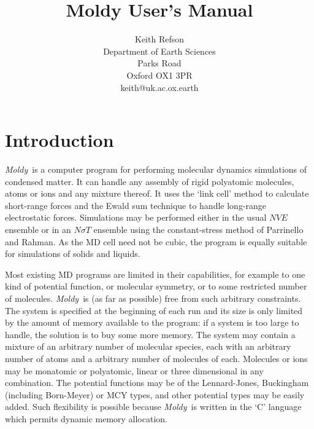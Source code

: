 \oddsidemargin=0in
\textwidth=6.5in
\title{{\Huge Moldy User's Manual}}
\author{Keith Refson\\Department of Earth Sciences\\Parks Road
\\Oxford OX1 3PR\\keith@uk.ac.ox.earth\\}

\newcommand{\moldy}{{\em Moldy}}
\newcommand{\etc}{{\em etc}}
\newcommand{\eg}{{\em e.g}.\ }
\newcommand{\ie}{{\em i.e}.\ }
\newcommand{\bm}[1]{\mbox{\boldmath \protect\(#1\protect\)}}

\newcommand{\erf}{\mbox{erf}}
\newcommand{\erfc}{\mbox{erfc}}

\maketitle
\tableofcontents

\chapter{Introduction}

\moldy\  is a computer program for performing molecular dynamics
simulations of condensed matter.  It can handle any assembly of rigid
polyatomic molecules, atoms or ions and any mixture thereof. It uses
the `link cell' method to calculate short-range forces and the Ewald
sum technique to handle long-range electrostatic forces.  Simulations
may be performed either in the usual $NVE$ ensemble or in an $N\sigma
T$ ensemble using the constant-stress method of Parrinello and Rahman.
As the MD cell need not be cubic, the program is equally suitable for
simulations of solids and liquids.

Most existing MD programs are limited in their capabilities, for
example to one kind of potential function, or molecular symmetry, or
to some restricted number of molecules.  \moldy\  is (as far as
possible) free from such arbitrary constraints.  The system is
specified at the beginning of each run and its size is only limited by
the amount of memory available to the program: if a system is too
large to handle, the solution is to buy some more memory.  The system
may contain a mixture of an arbitrary number of molecular species,
each with an arbitrary number of atoms and a arbitrary number of
molecules of each. Molecules or ions may be monatomic or polyatomic,
linear or three dimensional in any combination.  The potential
functions may be of the Lennard-Jones, Buckingham (including
Born-Meyer) or MCY types, and other potential types may be easily
added.  Such flexibility is possible because \moldy\  is written in the
`C' language which permits dynamic memory allocation.


